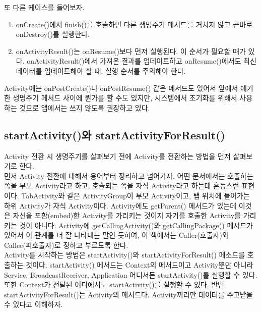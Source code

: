 또 다른 케이스를 들어보자.
\begin{enumerate}
\item onCreate()에서 finish()를 호출하면 다른 생명주기 메서드를 거치지 않고 곧바로 onDestroy()를 실행한다.
\item onActivityResult()는 onResume()보다 먼저 실행된다.
이 순서가 필요할 때가 있다. onActivityResult()에서 가져온 결과를 업데이트하고
onResume()에서도 최신 데이터를 업데이트해야 할 때, 실행 순서를 주의해야 한다.
\end{enumerate}

Activity에는 onPostCreate()나 onPostResume() 같은 메서드도 있어서 앞에서 얘기한 생명주기 메서드 사이에 뭔가를 할 수도 있지만, 시스템에서 초기화를 위해서 사용하는 것으로 앱에서는 쓰지 않도록 권장하고 있다.

\subsection{startActivity()와 startActivityForResult()}
Activity 전환 시 생명주기를 살펴보기 전에 Activity를 전환하는 방법을 먼저 살펴보기로 한다.\\

먼저 Activity 전환에 대해서 용어부터 정리하고 넘어가자.
어떤 문서에서는 호출하는 쪽을 부모 Activity라고 하고, 호출되는 쪽을 자식 Activity라고 하는데 혼동스런 표현이다. 
TabActivity와 같은 ActivityGroup이 부모 Activity이고, 탭 위치에 들어가는 하위 Activity가 자식 Activity이다. 
Activity에도 getParent() 메서드가 있는데 이것은 자신을 포함(embed)한 Activity를 가리키는 것이지 자기를 호출한 Activity를 가리키는 것이 아니다. 
Activity에 getCallingActivity()와 getCallingPackage() 메서드가 있어서 이 관계를 더 잘 나타내는 말인 듯하여, 이 책에서는 Caller(호출자)와 Callee(피호출자)로 정하고 부르도록 한다.\\

Activity를 시작하는 방법은 startActivity()와 startActivityForResult() 메소드를 호출하는 것이다.
startActivity() 메서드는 Context의 메서드이고 Activity뿐만 아니라 Service, BroadcastReceiver, Application 어디서든 startActivity()를 실행할 수 있다. 
또한 Context가 전달된 어디에서도 startActivity()를 실행할 수 있다.
반면 startActivityForResult()는 Activity의 메서드다. Activity끼리만 데이터를 주고받을 수 있다고 이해하자.\\


